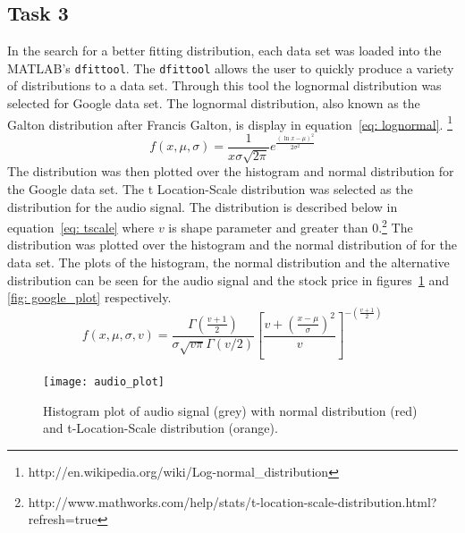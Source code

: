 \subsection*{Task 3} 
In the search for a better fitting distribution, each data set was loaded into the MATLAB's \verb|dfittool|. The \verb|dfittool| allows the user to quickly produce a variety of distributions to a data set. Through this tool the lognormal distribution was selected for Google data set.  The lognormal distribution, also known as the Galton distribution after Francis Galton, is display in equation~\ref{eq: lognormal}. \footnote{http://en.wikipedia.org/wiki/Log-normal\_distribution}
\begin{equation}
f(x, \mu, \sigma) = \frac{1}{x\sigma\sqrt{2\pi}}e^{\frac{(\ln{x}-\mu)^2}{2\sigma^2}}
\label{eq: lognormal}
\end{equation}
The distribution was then plotted over the histogram and normal distribution for the Google data set. The t Location-Scale distribution was selected as the distribution for the audio signal. The distribution is described below in equation~\ref{eq: tscale} where $v$ is shape parameter and greater than 0.\footnote{http://www.mathworks.com/help/stats/t-location-scale-distribution.html?refresh=true} The distribution was plotted over the histogram and the normal distribution of for the data set. The plots of the histogram, the normal distribution and the alternative distribution can be seen for the audio signal and the stock price in figures~\ref{fig: audio_plot} and \ref{fig: google_plot} respectively. 
\begin{equation}
f(x, \mu, \sigma, v) = \frac{\Gamma \left(\frac{v+1}{2}\right)}{\sigma\sqrt{v\pi}\Gamma(v/2)}\left[\frac{v + \left( \frac{x - \mu}{\sigma} \right)^2}{v} \right]^{-\left(\frac{v+1}{2}\right)}
\label{eq: tscale}
\end{equation}
 

\begin{figure}[H] %
	\centering 
	\texttt{[image: audio\_plot]}
	\caption{Histogram plot of audio signal (grey) with normal distribution (red) and t-Location-Scale distribution (orange).}
	\label{fig: audio_plot} 
\end{figure}

